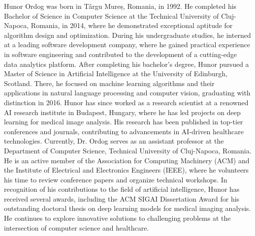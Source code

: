 \documentclass[journal,twoside,web]{ieeecolor}
\begin{document}
\begin{IEEEbiography}{Hunor Ordog} was born in Târgu Mureș, Romania, in 1992. He completed his Bachelor of Science in Computer Science at the Technical University of Cluj-Napoca, Romania, in 2014, where he demonstrated exceptional aptitude for algorithm design and optimization.
    During his undergraduate studies, he interned at a leading software development company, where he gained practical experience in software engineering and contributed to the development of a cutting-edge data analytics platform.
    After completing his bachelor's degree, Hunor pursued a Master of Science in Artificial Intelligence at the University of Edinburgh, Scotland. There, he focused on machine learning algorithms and their applications in natural language processing and computer vision, graduating with distinction in 2016.
    Hunor has since worked as a research scientist at a renowned AI research institute in Budapest, Hungary, where he has led projects on deep learning for medical image analysis. His research has been published in top-tier conferences and journals, contributing to advancements in AI-driven healthcare technologies.
    Currently, Dr. Ordog serves as an assistant professor at the Department of Computer Science, Technical University of Cluj-Napoca, Romania. He is an active member of the Association for Computing Machinery (ACM) and the Institute of Electrical and Electronics Engineers (IEEE), where he volunteers his time to review conference papers and organize technical workshops.
    In recognition of his contributions to the field of artificial intelligence, Hunor has received several awards, including the ACM SIGAI Dissertation Award for his outstanding doctoral thesis on deep learning models for medical imaging analysis. He continues to explore innovative solutions to challenging problems at the intersection of computer science and healthcare.
\end{IEEEbiography}
\end{document}

